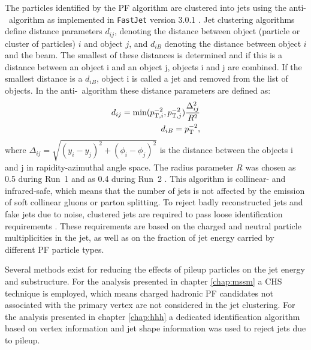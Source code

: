 The particles identified by the \ac{PF} algorithm
are clustered into jets using the anti-\kT~algorithm \cite{antiKT} as implemented
in \texttt{FastJet} version 3.0.1 \cite{fastjet}. Jet clustering algorithms 
define distance parameters $d_{ij}$, denoting the distance between object (particle or cluster of 
particles) $i$ and 
object $j$, and $d_{iB}$ denoting the distance between 
object $i$ and the beam. The smallest of these distances
is determined and if this is a distance between an object i and an object j, objects
i and j are combined. If the smallest distance is a $d_{iB}$, object i
is called a jet and removed from the list of objects. In the anti-\kT~algorithm
these distance parameters are defined as:
\begin{align}\label{eqn:objects_antikt}
d_{ij}=\text{min}(p_{\text{T},i}^{-2},p_{\text{T},j}^{-2})\frac{\Delta_{ij}^2}{R^2}\notag\\
d_{iB} = p_{\text{T}}^{-2},
\end{align}
where $\Delta_{ij} = \sqrt{(y_i-y_j)^2+(\phi_i - \phi_j)^2}$ is the distance
between the objects i and j in rapidity-azimuthal angle space. The radius
parameter $R$ was chosen as 0.5 during Run~1 \cite{cms-jec-2011} and as 0.4 during Run~2 \cite{cms-jets-run2}. 
This algorithm is collinear- and infrared-safe, which means that the number of jets
is not affected by the emission of soft collinear gluons or parton splitting.
To reject badly reconstructed jets and fake jets due to noise, clustered jets are required to 
pass loose identification requirements \cite{cms-jet-algos-run1,cms-jets-run2}. These requirements are based on the 
charged and neutral particle multiplicities in the jet, as well as on the fraction
of jet energy carried by different \ac{PF} particle types.

Several methods exist for reducing the effects of pileup particles 
on the jet energy and substructure.
For the analysis presented in chapter \ref{chap:mssm} a
\ac{CHS} technique \cite{cms-jets-run2} is employed, 
which means charged hadronic \ac{PF} candidates not associated with the primary vertex 
are not considered in the jet clustering. For the analysis presented in
chapter \ref{chap:hhh} a dedicated identification algorithm \cite{cms-jets-puid} 
based on vertex information and jet shape information was used to reject jets due to pileup.

